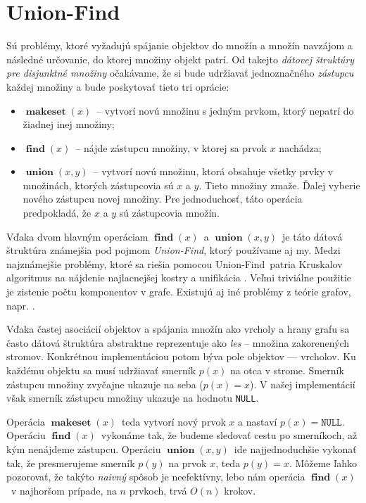 \def\uf{Union-Find}
\def\null{\texttt{NULL}}
\def\makeset{$\mathop{\mathbf{makeset}}(x)$}
\def\find{$\mathop{\mathbf{find}}(x)$}
\def\union{$\mathop{\mathbf{union}}(x, y)$}

\section{\uf}
Sú problémy, ktoré vyžadujú spájanie objektov do množín a množín navzájom 
a následné určovanie, do ktorej množiny objekt patrí. Od takejto \emph{
dátovej štruktúry pre disjunktné množiny} očakávame, že si bude udržiavať 
jednoznačného \emph{zástupcu} každej množiny a bude poskytovať 
tieto tri oprácie: 
\begin{itemize}
\item \makeset\ -- vytvorí novú množinu s jedným prvkom, ktorý 
nepatrí do žiadnej inej množiny;
\item \find\ -- nájde zástupcu množiny, v ktorej sa 
prvok $x$ nachádza;
\item \union\ -- vytvorí novú množinu, ktorá obsahuje 
všetky prvky v množinách, ktorých zástupcovia sú $x$ a $y$. Tieto 
množiny zmaže. Ďalej vyberie nového zástupcu novej množiny. Pre 
jednoduchosť, táto operácia predpokladá, že $x$ a $y$ sú 
zástupcovia množín.
\end{itemize}
Vďaka dvom hlavným operáciam \find\ a \union\ 
je táto dátová štruktúra známejšia pod pojmom \emph{\uf}, ktorý 
používame aj my. Medzi najznámejšie problémy, ktoré sa riešia pomocou 
\uf\ patria Kruskalov algoritmus na nájdenie najlacnejšej kostry 
\citep{kruskal} a unifikácia \citep{unif}. Veľmi triviálne použitie je 
zistenie počtu komponentov v grafe. Existujú aj iné problémy z teórie 
grafov, napr. \citet{paths1}.

Vďaka častej asociácií objektov a spájania množín ako vrcholy a hrany grafu 
sa často dátová štruktúra abstraktne reprezentuje ako 
\emph{les} -- množina zakorenených stromov. 
Konkrétnou implementáciou potom býva pole objektov --- vrcholov. Ku každému 
objektu sa musí udržiavať smerník $p(x)$ na otca v strome. Smerník zástupcu 
množiny zvyčajne ukazuje na seba ($p(x) = x$). V našej implementácií však 
smerník zástupcu množiny ukazuje na hodnotu \null.

Operácia \makeset\ teda vytvorí nový prvok $x$ a nastaví $p(x) = \null$. 
Operáciu \find\ vykonáme tak, že budeme sledovať cestu po smerníkoch, až 
kým nenájdeme zástupcu. 
Operáciu \union\ ide najjednoduchšie vykonať tak, že presmerujeme smerník 
$p(y)$ na prvok $x$, teda $p(y) = x$. 
Môžeme ľahko pozorovať, že takýto \emph{naivný} spôsob je neefektívny, 
lebo nám operácia \find\ v najhoršom prípade, na $n$ prvkoch, trvá $O(n)$ 
krokov. 

